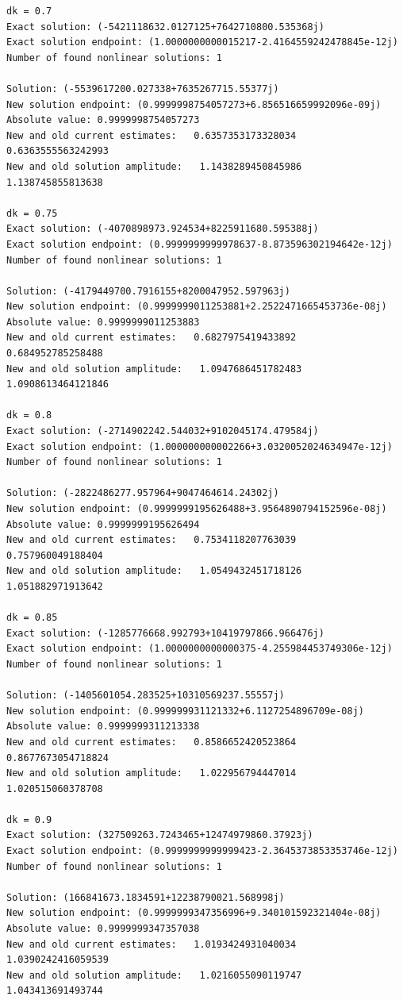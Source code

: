 \documentclass{article}
\begin{document}
\begin{verbatim}
dk = 0.7
Exact solution: (-5421118632.0127125+7642710800.535368j)
Exact solution endpoint: (1.0000000000015217-2.4164559242478845e-12j)
Number of found nonlinear solutions: 1

Solution: (-5539617200.027338+7635267715.55377j)
New solution endpoint: (0.9999998754057273+6.856516659992096e-09j) Absolute value: 0.9999998754057273
New and old current estimates:   0.6357353173328034    0.6363555563242993
New and old solution amplitude:   1.1438289450845986    1.138745855813638

dk = 0.75
Exact solution: (-4070898973.924534+8225911680.595388j)
Exact solution endpoint: (0.9999999999978637-8.873596302194642e-12j)
Number of found nonlinear solutions: 1

Solution: (-4179449700.7916155+8200047952.597963j)
New solution endpoint: (0.9999999011253881+2.2522471665453736e-08j) Absolute value: 0.9999999011253883
New and old current estimates:   0.6827975419433892    0.684952785258488
New and old solution amplitude:   1.0947686451782483    1.0908613464121846

dk = 0.8
Exact solution: (-2714902242.544032+9102045174.479584j)
Exact solution endpoint: (1.000000000002266+3.0320052024634947e-12j)
Number of found nonlinear solutions: 1

Solution: (-2822486277.957964+9047464614.24302j)
New solution endpoint: (0.9999999195626488+3.9564890794152596e-08j) Absolute value: 0.9999999195626494
New and old current estimates:   0.7534118207763039    0.757960049188404
New and old solution amplitude:   1.0549432451718126    1.051882971913642

dk = 0.85
Exact solution: (-1285776668.992793+10419797866.966476j)
Exact solution endpoint: (1.0000000000000375-4.255984453749306e-12j)
Number of found nonlinear solutions: 1

Solution: (-1405601054.283525+10310569237.55557j)
New solution endpoint: (0.999999931121332+6.1127254896709e-08j) Absolute value: 0.9999999311213338
New and old current estimates:   0.8586652420523864    0.8677673054718824
New and old solution amplitude:   1.022956794447014    1.020515060378708

dk = 0.9
Exact solution: (327509263.7243465+12474979860.37923j)
Exact solution endpoint: (0.9999999999999423-2.3645373853353746e-12j)
Number of found nonlinear solutions: 1

Solution: (166841673.1834591+12238790021.568998j)
New solution endpoint: (0.9999999347356996+9.340101592321404e-08j) Absolute value: 0.9999999347357038
New and old current estimates:   1.0193424931040034    1.0390242416059539
New and old solution amplitude:   1.0216055090119747    1.043413691493744


\end{verbatim}
\end{document}
